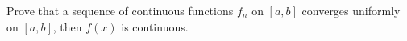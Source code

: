 Prove that a sequence of continuous functions $f_n$ on $[a,b]$ converges uniformly on $[a,b]$, then
$f(x)$ is continuous.\\
